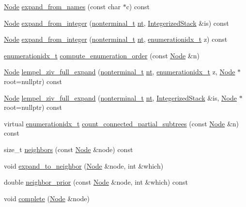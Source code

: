 \begin{DoxyCompactItemize}
\item 
\hyperlink{class_node}{Node} \hyperlink{class_grammar_af4f8e4c2b0ad93970e579ea56c2fde60}{expand\+\_\+from\+\_\+names} (const char $\ast$c) const
\item 
\hyperlink{class_node}{Node} \hyperlink{class_grammar_ab20256e7e9e4c6077043465b3d440be9}{expand\+\_\+from\+\_\+integer} (\hyperlink{_nonterminal_8h_a5c1f658dc7560600a16d22408bd716ca}{nonterminal\+\_\+t} \hyperlink{class_grammar_a047b55bfbd87c52e9d969af62c2932ab}{nt}, \hyperlink{class_integerized_stack}{Integerized\+Stack} \&is) const
\item 
\hyperlink{class_node}{Node} \hyperlink{class_grammar_a795d45fbbafb5c5dc17e5898a2016ce2}{expand\+\_\+from\+\_\+integer} (\hyperlink{_nonterminal_8h_a5c1f658dc7560600a16d22408bd716ca}{nonterminal\+\_\+t} \hyperlink{class_grammar_a047b55bfbd87c52e9d969af62c2932ab}{nt}, \hyperlink{_numerics_8h_a9fe2bbca873b046b2bd276fc6856bb88}{enumerationidx\+\_\+t} z) const
\item 
\hyperlink{_numerics_8h_a9fe2bbca873b046b2bd276fc6856bb88}{enumerationidx\+\_\+t} \hyperlink{class_grammar_a37b475b665c37057084d9244abcf25f9}{compute\+\_\+enumeration\+\_\+order} (const \hyperlink{class_node}{Node} \&n)
\item 
\hyperlink{class_node}{Node} \hyperlink{class_grammar_adea898b27f2cf76417e4b686c1045e54}{lempel\+\_\+ziv\+\_\+full\+\_\+expand} (\hyperlink{_nonterminal_8h_a5c1f658dc7560600a16d22408bd716ca}{nonterminal\+\_\+t} \hyperlink{class_grammar_a047b55bfbd87c52e9d969af62c2932ab}{nt}, \hyperlink{_numerics_8h_a9fe2bbca873b046b2bd276fc6856bb88}{enumerationidx\+\_\+t} z, \hyperlink{class_node}{Node} $\ast$root=nullptr) const
\item 
\hyperlink{class_node}{Node} \hyperlink{class_grammar_a37ccd1307ac9cb13a9653ba6c2134498}{lempel\+\_\+ziv\+\_\+full\+\_\+expand} (\hyperlink{_nonterminal_8h_a5c1f658dc7560600a16d22408bd716ca}{nonterminal\+\_\+t} \hyperlink{class_grammar_a047b55bfbd87c52e9d969af62c2932ab}{nt}, \hyperlink{class_integerized_stack}{Integerized\+Stack} \&is, \hyperlink{class_node}{Node} $\ast$root=nullptr) const
\item 
virtual \hyperlink{_numerics_8h_a9fe2bbca873b046b2bd276fc6856bb88}{enumerationidx\+\_\+t} \hyperlink{class_grammar_ad1e2c22753f18d1dcdd9d81576045e9f}{count\+\_\+connected\+\_\+partial\+\_\+subtrees} (const \hyperlink{class_node}{Node} \&n) const
\item 
size\+\_\+t \hyperlink{class_grammar_a486cec3b8e6c757eb348031ff8118a99}{neighbors} (const \hyperlink{class_node}{Node} \&node) const
\item 
void \hyperlink{class_grammar_a0765273e6b0957410447ad5d74e424bf}{expand\+\_\+to\+\_\+neighbor} (\hyperlink{class_node}{Node} \&node, int \&which)
\item 
double \hyperlink{class_grammar_a36e6e5072b99611de47c4be3ab78761c}{neighbor\+\_\+prior} (const \hyperlink{class_node}{Node} \&node, int \&which) const
\item 
void \hyperlink{class_grammar_a51a44e86d41c6e8a8ff7665208ac55da}{complete} (\hyperlink{class_node}{Node} \&node)
\end{DoxyCompactItemize}
